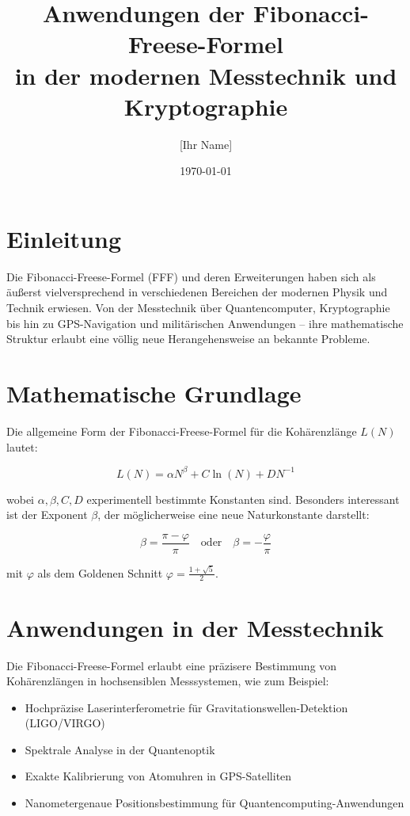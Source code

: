 \documentclass[a4paper,12pt]{article}
\title{Anwendungen der Fibonacci-Freese-Formel \\ in der modernen Messtechnik und Kryptographie}
\author{[Ihr Name]}
\date{\today}
\begin{document}
\maketitle

\section{Einleitung}

Die Fibonacci-Freese-Formel (FFF) und deren Erweiterungen haben sich als äußerst vielversprechend in verschiedenen Bereichen der modernen Physik und Technik erwiesen. Von der Messtechnik über Quantencomputer, Kryptographie bis hin zu GPS-Navigation und militärischen Anwendungen – ihre mathematische Struktur erlaubt eine völlig neue Herangehensweise an bekannte Probleme.

\section{Mathematische Grundlage}

Die allgemeine Form der Fibonacci-Freese-Formel für die Kohärenzlänge $L(N)$ lautet:

\begin{equation}
    L(N) = \alpha N^\beta + C \ln(N) + D N^{-1}
\end{equation}

wobei $\alpha, \beta, C, D$ experimentell bestimmte Konstanten sind. Besonders interessant ist der Exponent $\beta$, der möglicherweise eine neue Naturkonstante darstellt:

\begin{equation}
    \beta = \frac{\pi - \varphi}{\pi} \quad \text{oder} \quad \beta = -\frac{\varphi}{\pi}
\end{equation}

mit $\varphi$ als dem Goldenen Schnitt $\varphi = \frac{1+\sqrt{5}}{2}$.  

\section{Anwendungen in der Messtechnik}

Die Fibonacci-Freese-Formel erlaubt eine präzisere Bestimmung von Kohärenzlängen in hochsensiblen Messsystemen, wie zum Beispiel:

\begin{itemize}
    \item Hochpräzise Laserinterferometrie für Gravitationswellen-Detektion (LIGO/VIRGO)
    \item Spektrale Analyse in der Quantenoptik
    \item Exakte Kalibrierung von Atomuhren in GPS-Satelliten
    \item Nanometergenaue Positionsbestimmung für Quantencomputing-Anwendungen
\end{itemize}
\end{document}
